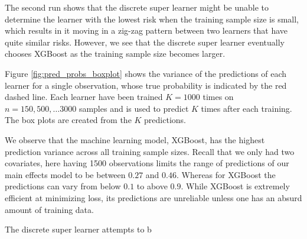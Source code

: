 \documentclass[11pt, a4paper]{article}
\theoremstyle{definition}
\theoremstyle{remark}
\begin{document}
The second run shows that the discrete super learner might be unable to determine the learner with the lowest risk when the training sample size is small, which results in it moving in a zig-zag pattern between two learners that have quite similar risks. However, we see that the discrete super learner eventually chooses XGBoost as the training sample size becomes larger.  

Figure \ref{fig:pred_probs_boxplot} shows the variance of the predictions of each learner for a single observation, whose true probability is indicated by the red dashed line. Each learner have been trained $ K = 1000 $ times on $ n = 150, 500, \dots 3000 $ samples and is used to predict $ K $ times after each training. The box plots are created from the $ K $ predictions. 

We observe that the machine learning model, XGBoost, has the highest prediction variance across all training sample sizes. Recall that we only had two covariates, here having 1500 observations limits the range of predictions of our main effects model to be between $ 0.27 $ and $ 0.46 $. Whereas for XGBoost the predictions can vary from below $ 0.1 $ to above $ 0.9 $. While XGBoost is extremely efficient at minimizing loss, its predictions are unreliable unless one has an absurd amount of training data. 

The discrete super learner attempts to b 

\printbibliography
\end{document}
